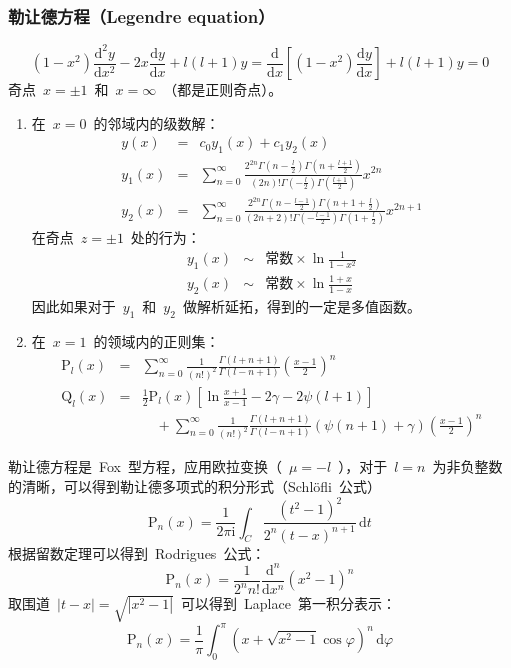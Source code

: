 \documentclass[12pt,a4paper]{article}
\newcommand\dif{\mathrm{d}}
\newcommand\diff{\,\mathrm{d}}
\renewcommand{\[}{\ $\displaystyle}
\renewcommand{\]}{$\ }%
\newcommand{\fdif}[2]{\ensuremath{\frac{\dif #1}{\dif #2}}}
\newcommand{\fdifsq}[2]{\ensuremath{\frac{\dif^2 #1}{\dif #2^2}}}
\newcommand\mi{\mathrm{i}}
\newcommand{\summ}[2][n]{\sum_{#1=#2}^\infty}
\begin{document}
	 \subsubsection{勒让德方程（Legendre equation）}
	 \newcommand{\fp}[2][l]{\ensuremath{\mathrm{P}_{#1}\left(#2\right)}}
	 	$$
	 		(1-x^2)\fdifsq{y}{x} - 2x\fdif{y}{x} + l(l+1)y =\fdif{}{x}\left[(1-x^2)\fdif{y}{x}\right]+l(l+1)y = 0
	 	$$
	 	奇点\[x=\pm 1\]和\[x=\infty\]（都是正则奇点）。
	 	\begin{enumerate}
		\item 在\[x=0\]的邻域内的级数解：
	 	\begin{eqnarray*}
	 		y(x) &=& c_0y_1(x) + c_1 y_2(x) \\
	 		y_1(x) &=& \summ{0} \frac{2^{2n}\Gamma\left(n-\frac l2\right)\Gamma\left(n+\frac{l+1}2\right)}{(2n)!\Gamma\left(-\frac l2\right)\Gamma\left(\frac{l+1}2\right)}x^{2n}\\
	 		y_2(x) &=& \summ{0}\frac{2^{2n}\Gamma\left(n-\frac{l-1}2\right)\Gamma\left(n+1+\frac l2\right)}{(2n+2)!\Gamma\left(-\frac{l-1}2\right)\Gamma\left(1+\frac l2\right)}x^{2n+1}
	 	\end{eqnarray*}
	 	在奇点\[z = \pm 1\]处的行为：
	 	\begin{eqnarray*}
	 		y_1(x) &\sim & \mbox{常数}\times \ln \frac{1}{1-x^2} \\
	 		y_2(x) &\sim & \mbox{常数}\times \ln \frac{1+x}{1-x}
	 	\end{eqnarray*}
	 	因此如果对于\[y_1\]和\[y_2\]做解析延拓，得到的一定是多值函数。
	 	\item 在\[x=1\]的领域内的正则集：
	 	\begin{eqnarray*}
	 	 \fp{x} &=& \summ{0} \frac 1{(n!)^2}\frac{\Gamma(l+n+1)}{\Gamma(l-n+1)}\left(\frac{x-1}{2}\right)^n \\
	 	 \mathrm Q_l(x) &=& \frac 12 \fp{x}\left[ \ln\frac{x+1}{x-1} - 2\gamma - 2\psi (l+1)\right] \\
	 	 	&&\quad +\summ{0}\frac{1}{(n!)^2}\frac{\Gamma(l+n+1)}{\Gamma(l-n+1)}(\psi(n+1)+\gamma)\left(\frac{x-1}2\right)^n
	 	\end{eqnarray*}
	 	\end{enumerate}
	 	
	 	勒让德方程是~Fox~型方程，应用欧拉变换（\[\mu = -l\]），对于\[l = n\]为非负整数的清晰，可以得到勒让德多项式的积分形式（Schl\"ofli~公式）
	 	$$
	 	  \fp[n]{x} = \frac{1}{2\pi\mi}\int_C\frac{(t^2-1)^2}{2^n(t-x)^{n+1}}\diff t
	 	$$
	 	根据留数定理可以得到~Rodrigues~公式：
	 	$$
	 	  \fp[n]{x} = \frac 1{2^n n!}\frac{\dif^n}{\dif x^n}(x^2 - 1)^n
	 	$$
	 	取围道\[|t-x| = \sqrt{|x^2 -1|}\]可以得到~Laplace~第一积分表示：
	 	$$
	 	  \fp[n]{x} = \frac{1}{\pi}\int_0^\pi\left(x+\sqrt{x^2 - 1}\cos \varphi\right)^n\diff\varphi
	 	$$
	 	
\end{document}
